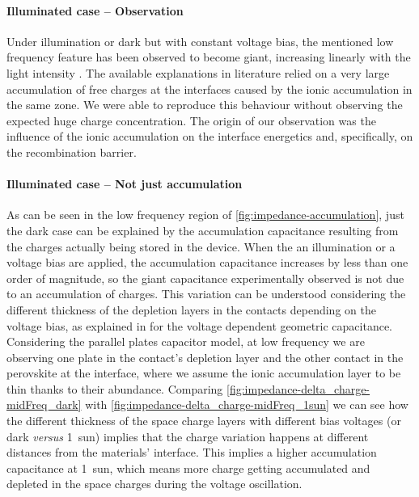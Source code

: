 	\paragraph{Illuminated case -- Observation}
Under illumination or dark but with constant voltage bias, the mentioned low frequency feature has been observed to become giant, increasing linearly with the light intensity \cite{Juarez-Perez2014,Kim2015c,Zarazua2016,Zarazua2016a,Almora2018}.
The available explanations in literature relied on a very large accumulation of free charges at the interfaces caused by the ionic accumulation in the same zone.
We were able to reproduce this behaviour without observing the expected huge charge concentration.
The origin of our observation was the influence of the ionic accumulation on the interface energetics and, specifically, on the recombination barrier.


	\paragraph{Illuminated case -- Not just accumulation}
	As can be seen in the low frequency region of \cref{fig:impedance-accumulation}, just the dark case can be explained by the accumulation capacitance resulting from the charges actually being stored in the device.
	When the an illumination or a voltage bias are applied, the accumulation capacitance increases by less than one order of magnitude, so the giant capacitance experimentally observed is not due to an accumulation of charges.
	This variation can be understood considering the different thickness of the depletion layers in the contacts depending on the voltage bias, as explained in  for the voltage dependent geometric capacitance.
	Considering the parallel plates capacitor model, at low frequency we are observing one plate in the contact's depletion layer and the other contact in the perovskite at the interface, where we assume the ionic accumulation layer to be thin thanks to their abundance.
	Comparing \cref{fig:impedance-delta_charge-midFreq_dark} with \cref{fig:impedance-delta_charge-midFreq_1sun} we can see how the different thickness of the space charge layers with different bias voltages (or dark \textsl{versus} \SI{1}{sun}) implies that the charge variation happens at different distances from the materials' interface.
	This implies a higher accumulation capacitance at \SI{1}{sun}, which means more charge getting accumulated and depleted in the space charges during the voltage oscillation.
	
